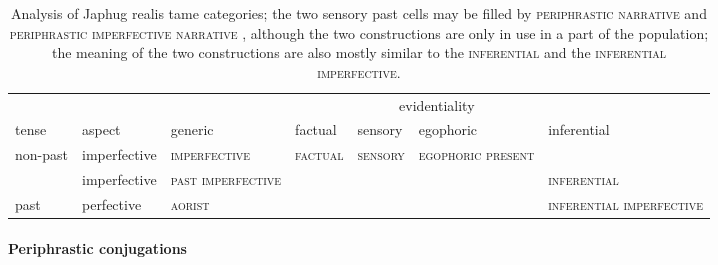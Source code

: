 \documentclass[a4paper, oneside, 12pt]{report}
\newcommand*{\citesec}[1]{\S~{#1}}
\newcommand*{\citepage}[1]{p.~{#1}}
\newcommand{\category}[1]{\textsc{#1}}
\begin{document}
\begin{table}[H]
    \centering
    \caption{Analysis of Japhug realis \acs{tame} categories;
    the two sensory past cells may be filled by 
    \category{periphrastic narrative} \citep[\citesec{21.5.1.8}]{jacques2021grammar}
    and \category{periphrastic imperfective narrative} \citep[\citepage{1157}]{jacques2021grammar},
    although the two constructions are only in use in a part of the population; 
    the meaning of the two constructions are also mostly similar to 
    the \category{inferential} and the \category{inferential imperfective}. }
    \label{tbl:realis-tam}
    \scriptsize
    \begin{tabular}{lllllll}
        \toprule
                                &                          & \multicolumn{5}{c}{evidentiality}                                                                                                                                                                        \\ \cmidrule(l){3-7} 
        \multirow{-2}{*}{tense} & \multirow{-2}{*}{aspect} & generic                           & factual                           & sensory                           & egophoric                         & inferential                                              \\ \midrule
        non-past                & imperfective             & \category{imperfective}             & \category{factual}                  & \category{sensory}                  & \category{egophoric present}        & \cellcolor[HTML]{C0C0C0}{\color[HTML]{C0C0C0} \category{}} \\ \midrule
                                & imperfective             & \category{past imperfective}        & \cellcolor[HTML]{C0C0C0}\category{} & \cellcolor[HTML]{C0C0C0}\category{} & \cellcolor[HTML]{C0C0C0}\category{} & \category{inferential}                                     \\ \cmidrule(l){2-7} 
        \multirow{-2}{*}{past}  & perfective               & \category{aorist} & \cellcolor[HTML]{C0C0C0}\category{} & \cellcolor[HTML]{C0C0C0}\category{} & \cellcolor[HTML]{C0C0C0}\category{} & \category{inferential imperfective}                        \\ \bottomrule
    \end{tabular}
\end{table}

\paragraph*{Periphrastic conjugations} 
\end{document}
